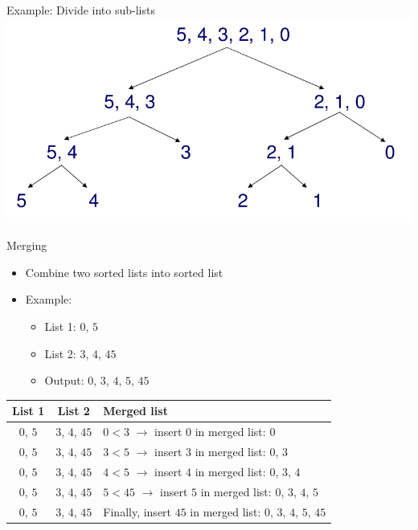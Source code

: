 \begin{frame}{Example: Divide into sub-lists}
  \includegraphics[width=\textwidth]{figures/mergesort-divide}  
\end{frame}

\begin{frame}{Merging}
  \begin{itemize}
  \item Combine two sorted lists into sorted list
  \item Example:
    \begin{itemize}
    \item List 1: $0$, $5$
    \item List 2: $3$, $4$, $45$
    \item Output: $0$, $3$, $4$, $5$, $45$
    \end{itemize}
  \end{itemize}

  
  \begin{center}
    \begin{tabular}{c|c|l}
      List 1 & List 2 & Merged list \\\hline
      \alert{$0$}, $5$ & \alert{$3$}, $4$, $45$ & $0 < 3$ $\rightarrow$ insert $0$ in merged list: \alert{$0$} \\
      $0$, \alert{$5$} & \alert{$3$}, $4$, $45$ & $3 < 5$ $\rightarrow$ insert $3$ in merged list: $0$, \alert{$3$} \\
      $0$, \alert{$5$} & $3$, \alert{$4$}, $45$ & $4 < 5$ $\rightarrow$ insert $4$ in merged list: $0$, $3$, \alert{$4$} \\
      $0$, \alert{$5$} & $3$, $4$, \alert{$45$} & $5 < 45$ $\rightarrow$ insert $5$ in merged list: $0$, $3$, $4$, \alert{$5$} \\
      $0$, $5$ & $3$, $4$, \alert{$45$} & Finally, insert $45$ in merged list: $0$, $3$, $4$, $5$, \alert{$45$} \\
    \end{tabular}        
  \end{center}  
\end{frame}

